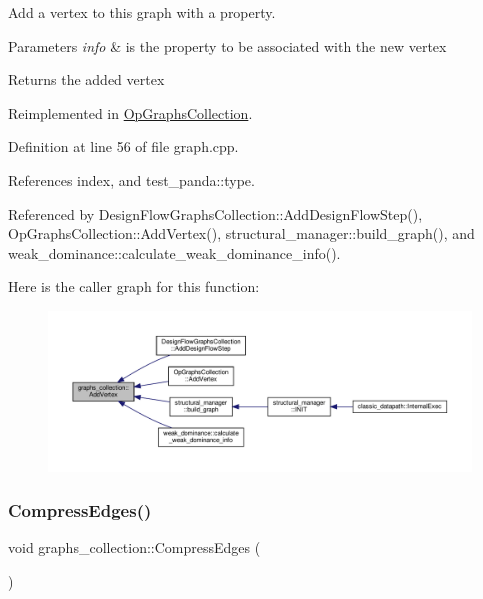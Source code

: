 Add a vertex to this graph with a property. 


\begin{DoxyParams}{Parameters}
{\em info} & is the property to be associated with the new vertex \\
\hline
\end{DoxyParams}
\begin{DoxyReturn}{Returns}
the added vertex 
\end{DoxyReturn}


Reimplemented in \hyperlink{classOpGraphsCollection_afbe13994e2c675945ff79b4bf01163fd}{Op\+Graphs\+Collection}.



Definition at line 56 of file graph.\+cpp.



References index, and test\+\_\+panda\+::type.



Referenced by Design\+Flow\+Graphs\+Collection\+::\+Add\+Design\+Flow\+Step(), Op\+Graphs\+Collection\+::\+Add\+Vertex(), structural\+\_\+manager\+::build\+\_\+graph(), and weak\+\_\+dominance\+::calculate\+\_\+weak\+\_\+dominance\+\_\+info().

Here is the caller graph for this function\+:
\nopagebreak
\begin{figure}[H]
\begin{center}
\leavevmode
\includegraphics[width=350pt]{d8/d8d/structgraphs__collection_ad0c9e75687200d3de0cb4a7c0880042c_icgraph}
\end{center}
\end{figure}
\mbox{\label{structgraphs__collection_a12d20bedcccbecf2d7af587f377d5a63}} 
\subsubsection{\texorpdfstring{Compress\+Edges()}{CompressEdges()}}
{\footnotesize\ttfamily void graphs\+\_\+collection\+::\+Compress\+Edges (\begin{DoxyParamCaption}{ }\end{DoxyParamCaption})\hspace{0.3cm}{\ttfamily [inline]}}



